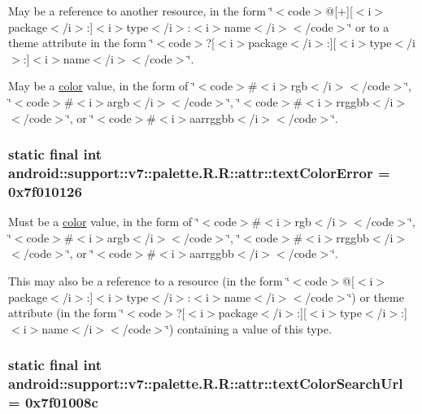 May be a reference to another resource, in the form \char`\"{}$<$code$>$@\mbox{[}+\mbox{]}\mbox{[}$<$i$>$package$<$/i$>$:\mbox{]}$<$i$>$type$<$/i$>$:$<$i$>$name$<$/i$>$$<$/code$>$\char`\"{} or to a theme attribute in the form \char`\"{}$<$code$>$?\mbox{[}$<$i$>$package$<$/i$>$:\mbox{]}\mbox{[}$<$i$>$type$<$/i$>$:\mbox{]}$<$i$>$name$<$/i$>$$<$/code$>$\char`\"{}. 

May be a \hyperlink{classandroid_1_1support_1_1v7_1_1palette_1_1_r_1_1color}{color} value, in the form of \char`\"{}$<$code$>$\#$<$i$>$rgb$<$/i$>$$<$/code$>$\char`\"{}, \char`\"{}$<$code$>$\#$<$i$>$argb$<$/i$>$$<$/code$>$\char`\"{}, \char`\"{}$<$code$>$\#$<$i$>$rrggbb$<$/i$>$$<$/code$>$\char`\"{}, or \char`\"{}$<$code$>$\#$<$i$>$aarrggbb$<$/i$>$$<$/code$>$\char`\"{}. \hypertarget{classandroid_1_1support_1_1v7_1_1palette_1_1_r_1_1attr_20d85588e17c59c529d5e54589e3ca3b}{
\subsubsection[{textColorError}]{\setlength{\rightskip}{0pt plus 5cm}static final int android::support::v7::palette.R.R::attr::textColorError = 0x7f010126}}
\label{classandroid_1_1support_1_1v7_1_1palette_1_1_r_1_1attr_20d85588e17c59c529d5e54589e3ca3b}


Must be a \hyperlink{classandroid_1_1support_1_1v7_1_1palette_1_1_r_1_1color}{color} value, in the form of \char`\"{}$<$code$>$\#$<$i$>$rgb$<$/i$>$$<$/code$>$\char`\"{}, \char`\"{}$<$code$>$\#$<$i$>$argb$<$/i$>$$<$/code$>$\char`\"{}, \char`\"{}$<$code$>$\#$<$i$>$rrggbb$<$/i$>$$<$/code$>$\char`\"{}, or \char`\"{}$<$code$>$\#$<$i$>$aarrggbb$<$/i$>$$<$/code$>$\char`\"{}. 

This may also be a reference to a resource (in the form \char`\"{}$<$code$>$@\mbox{[}$<$i$>$package$<$/i$>$:\mbox{]}$<$i$>$type$<$/i$>$:$<$i$>$name$<$/i$>$$<$/code$>$\char`\"{}) or theme attribute (in the form \char`\"{}$<$code$>$?\mbox{[}$<$i$>$package$<$/i$>$:\mbox{]}\mbox{[}$<$i$>$type$<$/i$>$:\mbox{]}$<$i$>$name$<$/i$>$$<$/code$>$\char`\"{}) containing a value of this type. \hypertarget{classandroid_1_1support_1_1v7_1_1palette_1_1_r_1_1attr_a345bae544e67896e14403c4cf3bd386}{
\subsubsection[{textColorSearchUrl}]{\setlength{\rightskip}{0pt plus 5cm}static final int android::support::v7::palette.R.R::attr::textColorSearchUrl = 0x7f01008c}}
\label{classandroid_1_1support_1_1v7_1_1palette_1_1_r_1_1attr_a345bae544e67896e14403c4cf3bd386}


